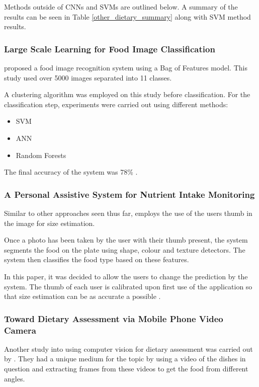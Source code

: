 Methods outside of CNNs and SVMs are outlined below.
A summary of the results can be seen in Table \ref{other_dietary_summary} along with SVM method results.

\subsubsection*{Large Scale Learning for Food Image Classification}
\textcite{LSL_2015} proposed a food image recognition system using a Bag of Features model.
This study used over 5000 images separated into 11 classes.

A clustering algorithm was employed on this study before classification.
For the classification step, experiments were carried out using different methods:
\begin{itemize}
	\item{SVM}
	\item{ANN}
	\item{Random Forests}
\end{itemize}

The final accuracy of the system was 78\% \textcite{LSL_2015}.


\subsubsection*{A Personal Assistive System for Nutrient Intake Monitoring}
Similar to other approaches seen thus far, \textcite{personalAssistive} employs the use of the users thumb in the image for size estimation.

Once a photo has been taken by the user with their thumb present, the system segments the food on the plate using shape, colour and texture detectors.
The system then classifies the food type based on these features.

In this paper, it was decided to allow the users to change the prediction by the system.
The thumb of each user is calibrated upon first use of the application so that size estimation can be as accurate a possible \textcite{personalAssistive}.

\subsubsection*{Toward Dietary Assessment via Mobile Phone Video Camera}
Another study into using computer vision for dietary assessment was carried out by \textcite{chen2010toward}. They had a unique medium for the topic by using a video of the dishes in question and extracting frames from these videos to get the food from different angles.

